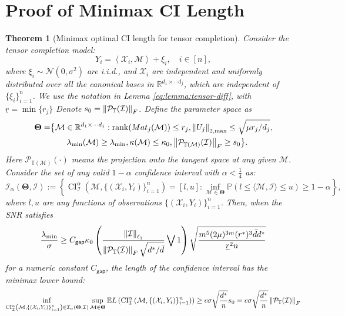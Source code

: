 \documentclass[12pt]{article}
\newcommand{\tF}{{\rm F}}
\newcommand{\Mat}{{\rm Mat}}
\newcommand{\norm}[1]{\left\lVert#1\right\rVert}
\newcommand{\R}{\mathbb{R}}
\newcommand{\cP}{\mathcal{P}}
\newcommand{\cM}{\mathcal{M}}
\newcommand{\cI}{\mathcal{I}}
\newcommand{\cN}{\mathcal{N}}
\newcommand{\cX}{\mathcal{X}}
\def\TT{{\mathbb T}}
\newcommand{\gap}{{\mathsf{gap} }}
\newcommand{\dmax}{\bar{d}}
\newtheorem{Theorem}{Theorem}
\theoremstyle{plain}
\begin{document}
\section{Proof of Minimax CI Length}\label{Minimax}
\begin{Theorem}[Minimax optimal CI length for tensor completion] Consider the tensor completion model: 
\begin{equation*}
    Y_i=\left\langle\cX_i,\cM\right\rangle +\xi_i, \quad i\in[n],
\end{equation*}
where $\xi_i\sim \cN(0,\sigma^2)$ are i.i.d., and $\cX_i$ are independent and uniformly distributed over all the canonical bases in $\R^{d_1\times\cdots d_j}$, which are independent of $\{\xi_i\}_{i=1}^n$. We use the notation in Lemma \ref{eq:lemma:tensor-diff}, with $\underline{r}=\min\{r_j\}$ Denote $s_0=\norm{\cP_{\TT}(\cI)}_{\tF}$.
Define the parameter space as 
$$
\begin{aligned}
    \boldsymbol{\Theta}=&\big\{ \cM\in\R^{d_1\times\cdots d_j}: \operatorname{rank}(\Mat_j(\cM))\le r_j, \norm{U_j}_{2,\max}\le\sqrt{\mu r_j/d_j}, 
    \\
    &\quad\quad\lambda_{\min}(\cM)\ge \lambda_{\min}, \kappa(\cM)\le \kappa_0,\norm{\cP_{\TT(\cM)}(\cI)}_{\tF}\ge s_0 \big\}.
\end{aligned}
$$
Here $\cP_{\TT(\cM)}(\cdot)$ means the projection onto the tangent space at any given $\cM$.
Consider the set of any valid $1-\alpha$ confidence interval  with $\alpha<\frac{1}{4}$ as:
$$
\mathcal{I}_\alpha(\boldsymbol{\Theta}, \cI):=\left\{\operatorname{CI}_{\mathcal{I}}^\alpha\left(\cM, \{(\cX_i,Y_i)\}_{i=1}^n \right)=[l, u]: \inf _{\cM \in \boldsymbol{\Theta}} \mathbb{P}(l \leq\langle\cM, \cI\rangle \leq u ) \geq 1-\alpha\right\},
$$
where $l, u$ are any functions of observations $\{(\cX_i,Y_i)\}_{i=1}^n$. Then, when the SNR satisfies
\begin{equation*}
         \frac{\lambda_{\min}}{\sigma} \ge C_{\gap} \kappa_0\left(\frac{\norm{\cI}_{\ell_1}}{ \norm{\cP_{\TT}(\cI)}_{\tF}\sqrt{d^*/\dmax} }\bigvee 1\right) \sqrt{\frac{ m^5 (2\mu)^{3 m} (r^*)^{3 }\dmax d^* }{\underline{r}^2 n } }
\end{equation*}
for a numeric constant $C_{\gap}$, the length of the confidence interval has the minimax lower bound:
\begin{equation*}
    \inf_{\operatorname{CI}_{\mathcal{I}}^\alpha\left(\cM, \{(\cX_i,Y_i)\}_{i=1}^n \right) \in \mathcal{I}_\alpha(\boldsymbol{\Theta}, \cI) } \sup _{\cM\in \boldsymbol{\Theta} } \mathbb{E} L\left(\operatorname{CI}_{\mathcal{I}}^\alpha\left(\cM, \{(\cX_i,Y_i)\}_{i=1}^n \right)\right) \ge c\sigma \sqrt{\frac{d^*}{n}}s_0=c\sigma \sqrt{\frac{d^*}{n}}\norm{\cP_{\TT}(\cI)}_{\tF}
\end{equation*}
\end{Theorem}
\end{document}
